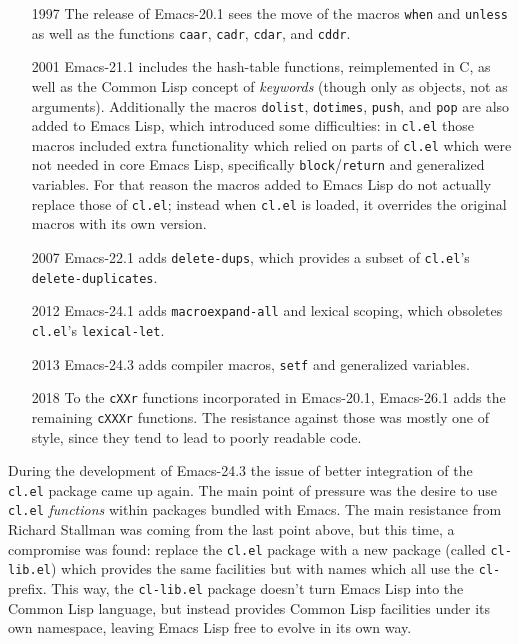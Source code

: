 \documentclass[format=acmsmall, review]{acmart}
\newcommand \Elisp {Emacs Lisp}
\begin{document}
\begin{itemize}
\item[1997] The release of Emacs-20.1 sees the move of the
  macros \texttt{when} and \texttt{unless} as well as the functions
  \texttt{caar}, \texttt{cadr}, \texttt{cdar}, and \texttt{cddr}.
\item[2001] Emacs-21.1 includes the hash-table functions, reimplemented in
  C, as well as the Common Lisp concept of \emph{keywords} (though only as
  objects, not as arguments).  Additionally the macros \texttt{dolist},
  \texttt{dotimes}, \texttt{push}, and \texttt{pop} are also added to
  \Elisp{}, which introduced some difficulties: in \texttt{cl.el} those
  macros included extra functionality which relied on parts of
  \texttt{cl.el} which were not needed in core \Elisp,
  specifically \texttt{block}/\texttt{return} and generalized variables.
  For that reason the macros added to \Elisp{} do not actually replace those
  of \texttt{cl.el}; instead when \texttt{cl.el} is loaded, it overrides the
  original macros with its own version.
\item[2007] Emacs-22.1 adds \texttt{delete-dups}, which provides a subset of
  \texttt{cl.el}'s \texttt{delete-duplicates}.
\item[2012] Emacs-24.1 adds \texttt{macroexpand-all} and lexical scoping,
  which obsoletes \texttt{cl.el}'s \texttt{lexical-let}.
\item[2013] Emacs-24.3 adds compiler macros, \texttt{setf} and
  generalized variables.
\item[2018] To the \texttt{cXXr} functions incorporated in Emacs-20.1,
  Emacs-26.1 adds the remaining \texttt{cXXXr} functions.  The resistance
  against those was mostly one of style, since they tend to lead to poorly
  readable code.
\end{itemize}
During the development of Emacs-24.3 the issue of better integration of the
\texttt{cl.el} package came up again.  The main point of pressure was the
desire to use \texttt{cl.el} \emph{functions} within packages bundled with
Emacs.  The main resistance from Richard Stallman was coming from the last point
above, but this time, a compromise was found: replace
the \texttt{cl.el} package with a new package (called \texttt{cl-lib.el})
which provides the same facilities but with names which all use the
\texttt{cl-} prefix.  This way, the \texttt{cl-lib.el} package doesn't turn
\Elisp{} into the Common Lisp language, but instead provides Common Lisp
facilities under its own namespace, leaving \Elisp{} free to evolve in its
own way.
\end{document}
